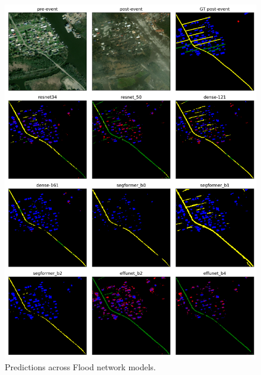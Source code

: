 \documentclass[10pt,twocolumn,letterpaper]{article}
\begin{document}
\clearpage
\begin{figure}[t]
 \centering
  \includegraphics[width=2\linewidth]{final-report/figures/sample_images_flood_0.png}
  \caption{Predictions across Flood network models.}
  \label{fig:sample_images_flood_0}
\end{figure}
\end{document}
